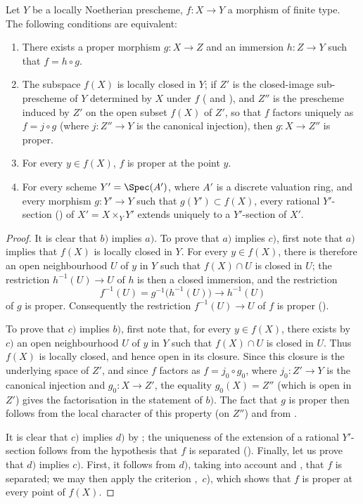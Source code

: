 \begin{corollary}[15.7.6]
\label{IV.15.7.6}
Let $Y$ be a locally Noetherian prescheme, $f:X\to Y$ a morphism of finite type.
The following conditions are equivalent:
\begin{enumerate}[label=\emph{\alph*)}]
  \item There exists a proper morphism $g:X\to Z$ and an immersion $h:Z\to Y$ such that $f=h\circ g$.
  \item The subspace $f(X)$ is locally closed in $Y$; if $Z'$ is the closed-image sub-prescheme of $Y$ determined by $X$ under $f$ ( and ), and $Z''$ is the prescheme induced by $Z'$ on the open subset $f(X)$ of $Z'$, so that $f$ factors uniquely as $f=j\circ g$ (where $j:Z''\to Y$ is the canonical injection), then $g:X\to Z''$ is proper.
  \item For every $y\in f(X)$, $f$ is proper at the point $y$.
  \item For every scheme $Y'=\Spec(A')$, where $A'$ is a discrete valuation ring, and every morphism $g:Y'\to Y$ such that $g(Y')\subset f(X)$, every rational $Y'$-section () of $X'=X\times_Y Y'$ extends uniquely to a $Y'$-section of $X'$.
\end{enumerate}
\end{corollary}

\begin{proof}
It is clear that $b)$ implies $a)$. To prove that $a)$ implies $c)$, first note that $a)$ implies that $f(X)$ is locally closed in $Y$. For every $y\in f(X)$, there is therefore an open neighbourhood $U$
of $y$ in $Y$ such that $f(X)\cap U$ is closed in $U$; the restriction $h^{-1}(U)\to U$ of $h$ is then a closed immersion, and the restriction
\[
  f^{-1}(U)=g^{-1}\bigl(h^{-1}(U)\bigr)\longrightarrow h^{-1}(U)
\]
of $g$ is proper. Consequently the restriction $f^{-1}(U)\to U$ of $f$ is proper ().

To prove that $c)$ implies $b)$, first note that, for every $y\in f(X)$, there exists by $c)$ an open neighbourhood $U$ of $y$ in $Y$ such that $f(X)\cap U$ is closed in $U$. Thus $f(X)$ is locally closed, and hence open in its closure. Since this closure is the underlying space of $Z'$, and since $f$ factors as $f=j_0\circ g_0$, where $j_0:Z'\to Y$ is the canonical injection and $g_0:X\to Z'$, the equality $g_0(X)=Z''$ (which is open in $Z'$) gives the factorisation in the statement of $b)$. The fact that $g$ is proper then follows from the local character of this property (on $Z''$) and from .

It is clear that $c)$ implies $d)$ by ; the uniqueness of the extension of a rational $Y'$-section follows from the hypothesis that $f$ is separated ().
Finally, let us prove that $d)$ implies $c)$. First, it follows from $d)$, taking into account  and , that $f$ is separated; we may then apply the criterion ,~$c$), which shows that $f$ is proper at every point of $f(X)$.
\end{proof}

